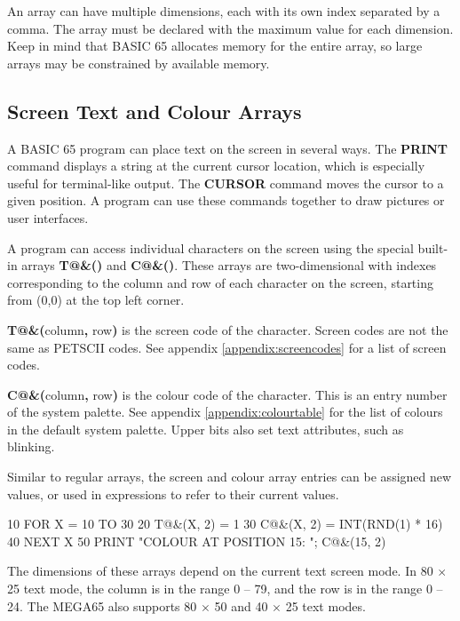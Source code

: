An array can have multiple dimensions, each with its own index separated by a comma. The array must be declared with the maximum value for each dimension. Keep in mind that BASIC 65 allocates memory for the entire array, so large arrays may be constrained by available memory.


\subsection{Screen Text and Colour Arrays}
\label{sec:screentextandcolourarrays}

A BASIC 65 program can place text on the screen in several ways. The {\bf PRINT} command displays a string at the current cursor location, which is especially useful for terminal-like output. The {\bf CURSOR} command moves the cursor to a given position. A program can use these commands together to draw pictures or user interfaces.

A program can access individual characters on the screen using the special built-in arrays \textbf{T@\&()} and \textbf{C@\&()}. These arrays are two-dimensional with indexes corresponding to the column and row of each character on the screen, starting from (0,0) at the top left corner.

\textbf{T@\&(}column{\bf ,} row{\bf )} is the screen code of the character. Screen codes are not the same as PETSCII codes. See appendix \vref{appendix:screencodes} for a list of screen codes.

\textbf{C@\&(}column{\bf ,} row{\bf )} is the colour code of the character. This is an entry number of the system palette. See appendix \vref{appendix:colourtable} for the list of colours in the default system palette. Upper bits also set text attributes, such as blinking.

Similar to regular arrays, the screen and colour array entries can be assigned new values, or used in expressions to refer to their current values.

\begin{screencode}
10 FOR X = 10 TO 30
20 T@&(X, 2) = 1
30 C@&(X, 2) = INT(RND(1) * 16)
40 NEXT X
50 PRINT "COLOUR AT POSITION 15: "; C@&(15, 2)
\end{screencode}

The dimensions of these arrays depend on the current text screen mode. In 80 $\times$ 25 text mode, the column is in the range 0 -- 79, and the row is in the range 0 -- 24. The MEGA65 also supports 80 $\times$ 50 and 40 $\times$ 25 text modes.

